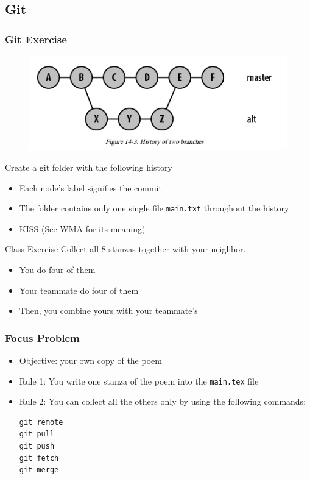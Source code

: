 \documentclass[hyperref={colorlinks=false},handout,10pt]{beamer}
\let\olditem\item
\renewcommand{\item}{\setlength{\itemsep}{0.5\baselineskip}\olditem}
\begin{document}
\subsection{Git} 
\begin{frame}[allowframebreaks]
    \frametitle{Git Exercise}
    \begin{figure}
        \begin{center}
            \includegraphics[width=\textwidth]{images/gitmergehistory.png}
        \end{center}
    \end{figure}
    \begin{block}{Create a git folder with the following history}
         \begin{itemize}
             \item Each node's label signifies the commit 
             \item The folder contains only one single file \texttt{main.txt}
                 throughout the history
             \item KISS (See WMA for its meaning)
         \end{itemize}
    \end{block}
    \begin{block}{Class Exercise}
        Collect all 8 stanzas together with your neighbor.
        \begin{itemize}
            \item You do four of them 
            \item Your teammate do four of them
            \item Then, you combine yours with your teammate's
        \end{itemize}
    \end{block}
    
\end{frame}


\begin{frame}[fragile]
    \frametitle{Focus Problem}
    \begin{itemize}
        \item Objective: your own copy of the poem
        \item Rule 1: You write one stanza of the poem into the
            \texttt{main.tex} file
        \item Rule 2: You can collect all the others only by using the following
            commands:
        \begin{lstlisting}
git remote 
git pull 
git push
git fetch 
git merge
        \end{lstlisting}
    \end{itemize}
    
\end{frame}
\end{document}
